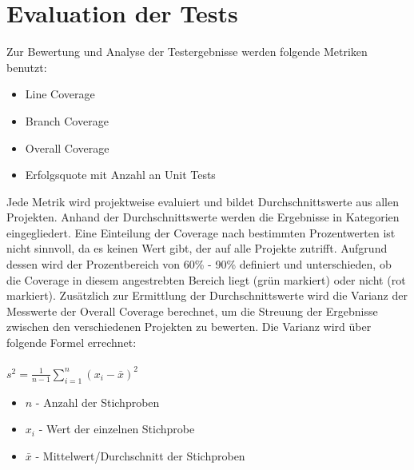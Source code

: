 \section{Evaluation der Tests}\label{section:eval}
Zur Bewertung und Analyse der Testergebnisse werden folgende Metriken benutzt: 
\begin{itemize}
    \setlength{\parskip}{1pt}
    \item Line Coverage
    \item Branch Coverage
    \item Overall Coverage
    \item Erfolgsquote mit Anzahl an Unit Tests
\end{itemize}
Jede Metrik wird projektweise evaluiert und bildet Durchschnittswerte aus allen Projekten. Anhand der Durchschnittswerte werden die Ergebnisse in Kategorien eingegliedert. Eine Einteilung der Coverage nach bestimmten Prozentwerten ist nicht sinnvoll, da es keinen Wert gibt, der auf alle Projekte zutrifft. Aufgrund dessen wird der Prozentbereich von 60\% - 90\% definiert und unterschieden, ob die Coverage in diesem angestrebten Bereich liegt (grün markiert) oder nicht (rot markiert). \cite{WhatReasonableCode} Zusätzlich zur Ermittlung der Durchschnittswerte wird die Varianz der Messwerte der Overall Coverage berechnet, um die Streuung der Ergebnisse zwischen den verschiedenen Projekten zu bewerten. Die Varianz wird über folgende Formel errechnet:\\\\
$s^2 = \frac{1}{n-1} \displaystyle\sum_{i=1}^{n} (x_i - \bar{x})^2$
\begin{itemize}
    \setlength{\parskip}{1pt}
    \item $n$ - Anzahl der Stichproben
    \item $x_i$ - Wert der einzelnen Stichprobe
    \item $\bar{x}$ - Mittelwert/Durchschnitt der Stichproben
\end{itemize}

